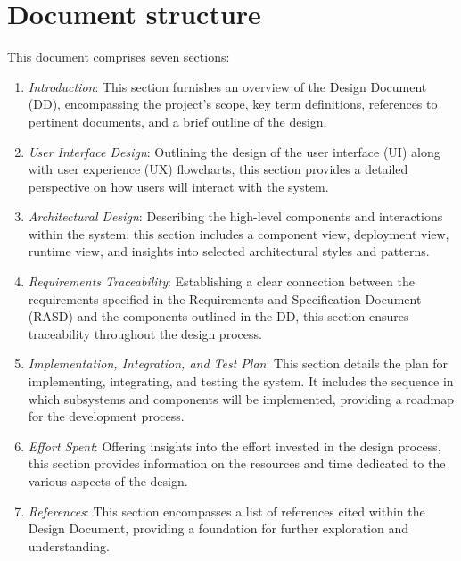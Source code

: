 \documentclass[12pt, a4paper]{report}
\begin{document}
    \section{Document structure}
    This document comprises seven sections:

    \begin{enumerate}
        \item \textit{Introduction}: This section furnishes an overview of the Design Document (DD), encompassing the project's scope, key term definitions, references to pertinent documents, and a brief outline of the design. 
        \item \textit{User Interface Design}: Outlining the design of the user interface (UI) along with user experience (UX) flowcharts, this section provides a detailed perspective on how users will interact with the system. 
        \item \textit{Architectural Design}: Describing the high-level components and interactions within the system, this section includes a component view, deployment view, runtime view, and insights into selected architectural styles and patterns.
        \item \textit{Requirements Traceability}: Establishing a clear connection between the requirements specified in the Requirements and Specification Document (RASD) and the components outlined in the DD, this section ensures traceability throughout the design process.
        \item \textit{Implementation, Integration, and Test Plan}: This section details the plan for implementing, integrating, and testing the system. It includes the sequence in which subsystems and components will be implemented, providing a roadmap for the development process.
        \item \textit{Effort Spent}: Offering insights into the effort invested in the design process, this section provides information on the resources and time dedicated to the various aspects of the design.                 
        \item \textit{References}: This section encompasses a list of references cited within the Design Document, providing a foundation for further exploration and understanding.
    \end{enumerate}   
    
\newpage 
\end{document}
